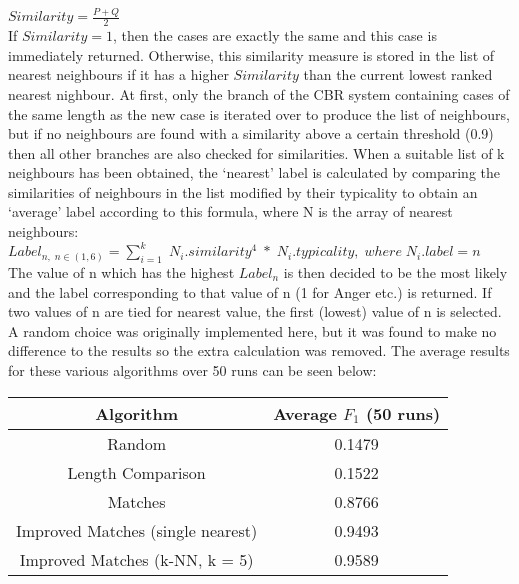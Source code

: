 \documentclass[a4paper]{article}
\begin{document}
$Similarity = \frac{P + Q}{2}$\\

If $Similarity = 1$, then the cases are exactly the same and this case is immediately returned. Otherwise, this similarity measure is stored in the
list of nearest neighbours if it has a higher $Similarity$ than the current lowest ranked nearest nighbour. At first, only the branch of the CBR
system containing cases of the same length as the new case is iterated over to produce the list of neighbours, but if no neighbours are found with
a similarity above a certain threshold (0.9) then all other branches are also checked for similarities. When a suitable list of k neighbours 
has been obtained, the `nearest' label is calculated by comparing the similarities of neighbours in the list modified by their typicality to
obtain an `average' label according to this formula, where N is the array of nearest neighbours:\\

$Label_{n,\;n \in (1,6)} = \sum_{i=1}^{k}\;N_i.similarity^4\;*\;N_i.typicality,\;where\;N_i.label = n$\\

The value of n which has the highest $Label_n$ is then decided to be the most likely and the label corresponding to that value of n (1 for Anger etc.)
is returned. If two values of n are tied for nearest value, the first
(lowest) value of n is selected. A random choice was originally implemented here, but it was found to make no difference to the results so the 
extra calculation was removed. The average results for these various algorithms over 50 runs can be seen below:\\

\begin{center}
  \begin{tabular}{c|c}
    Algorithm & Average $F_1$ (50 runs)\\
    \hline
    Random &  0.1479\\
	Length Comparison &  0.1522\\
	Matches &  0.8766\\
	Improved Matches (single nearest) &  0.9493\\
	Improved Matches (k-NN, k = 5) &  0.9589\\
  \end{tabular}\\
  \end{center}
  
  
\end{document}
